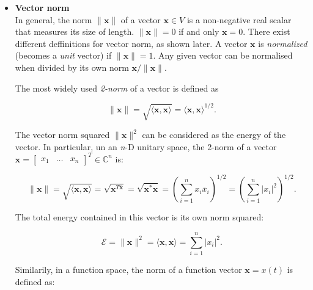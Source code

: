 \documentclass[10pt,b5paper,titlepage]{book}
\begin{document}
\begin{itemize}
    \item \textbf{Vector norm}\\

        In general, the norm $\|\mathbf{x}\|$ of a vector $\mathbf{x} \in V$
        is a non-negative real scalar that measures its size of length.
        $\|\mathbf{x}\| = 0$ if and only $\mathbf{x} = 0$. There exist
        different deffinitions for vector norm, as shown later. A vector
        $\mathbf{x}$ is \textit{normalized} (becomes a \textit{unit} vector)
        if $\|\mathbf{x}\| = 1$. Any given vector can be normalised when
        divided by its own norm $\mathbf{x} / \|\mathbf{x}\|$.

        The most widely used \textit{2-norm} of a vector is defined as

        \begin{equation}
            \|\mathbf{x}\| = \sqrt{\langle \mathbf{x}, \mathbf{x} \rangle}
            = \langle \mathbf{x}, \mathbf{x} \rangle^{1 / 2}
        .\end{equation}

        The vector norm squared $\|\mathbf{x}\|^{2}$ can be considered
        as the energy of the vector. In particular, un an \textit{n}-D
        unitary space, the 2-norm of a vector
        $\mathbf{x} = \begin{bmatrix} x_1 & \ldots & x_n \end{bmatrix}^{T} \in \mathbb{C}^{n}$ is:

        \begin{equation}
            \|\mathbf{x}\| = \sqrt{\langle \mathbf{x}, \mathbf{x} \rangle}
            = \sqrt{\mathbf{x}^{T \overline{\mathbf{x}}}}
            = \sqrt{\mathbf{x}^{*} \mathbf{x}}
            = \left( \sum_{i=1}^{n} x_{i} \overline{x}_{i} \right)^{1 / 2}
            = \left( \sum_{i=1}^{n} \left| x_{i} \right|^{2}  \right)^{1 / 2}
        .\end{equation}

        The total energy contained in this vector is its own norm squared:

        \begin{equation}
            \mathcal{E} = \|\mathbf{x}\|^{2}
            = \langle \mathbf{x}, \mathbf{x} \rangle
            = \sum_{i=1}^{n} \left| x_{i} \right|^{2}
        .\end{equation}

        Similarily, in a function space, the norm of a function vector
        $\mathbf{x} = x(t)$ is defined as:


\end{itemize}
\end{document}
